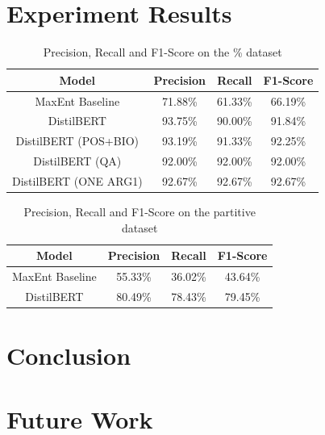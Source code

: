 \documentclass[11pt]{article}
\begin{document}
\section{Experiment Results}

\begin{table}
  \centering
  \begin{tabular}{c||c|c|c}
    \hline
    \textbf{Model}        & \textbf{Precision} & \textbf{Recall} & \textbf{F1-Score} \\
    \hline
    MaxEnt Baseline       & {71.88\%}          & {61.33\%}       & {66.19\%}         \\
    DistilBERT            & {93.75\%}          & {90.00\%}       & {91.84\%}         \\
    DistilBERT (POS+BIO)  & {93.19\%}          & {91.33\%}       & {92.25\%}         \\
    DistilBERT (QA)       & {92.00\%}          & {92.00\%}       & {92.00\%}         \\
    DistilBERT (ONE ARG1) & {92.67\%}          & {92.67\%}       & {92.67\%}         \\
    \hline
  \end{tabular}
  \caption{Precision, Recall and F1-Score on the \% dataset}
  \label{tab:results-on-first-dataset}
\end{table}

\begin{table}
  \centering
  \begin{tabular}{c||c|c|c}
    \hline
    \textbf{Model}  & \textbf{Precision} & \textbf{Recall} & \textbf{F1-Score} \\
    \hline
    MaxEnt Baseline & {55.33\%}          & {36.02\%}       & {43.64\%}         \\
    DistilBERT      & {80.49\%}          & {78.43\%}       & {79.45\%}         \\
    \hline
  \end{tabular}
  \caption{Precision, Recall and F1-Score on the partitive dataset}
  \label{tab:results-on-partitive-dataset}
\end{table}

\section{Conclusion}

\section{Future Work}
\end{document}
